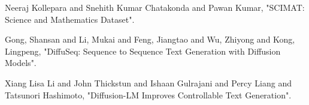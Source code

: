 \documentclass[
11pt,notheorems,hyperref={pdfauthor=whatever}
]{beamer}
\begin{document}
\begin{Large}
\begin{frame}

    \begin{thebibliography}{100} %
     Neeraj Kollepara and Snehith Kumar Chatakonda and Pawan Kumar, "SCIMAT: Science and Mathematics Dataset".

     Gong, Shansan and Li, Mukai and Feng, Jiangtao and Wu, Zhiyong and Kong, Lingpeng, "DiffuSeq: Sequence to Sequence Text Generation with Diffusion Models".

     Xiang Lisa Li and John Thickstun and Ishaan Gulrajani and Percy Liang and Tatsunori Hashimoto, "Diffusion-LM Improves Controllable Text Generation".
    
     
    \end{thebibliography}


\end{frame}

\end{Large}
\end{document}
